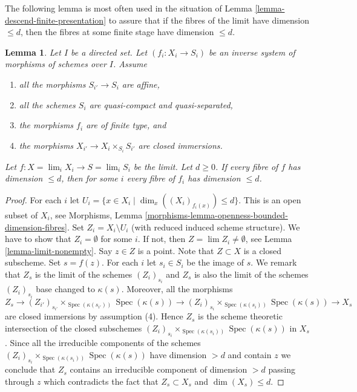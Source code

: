 \documentclass{stacks-project}
\theoremstyle{plain}
\newtheorem{lemma}[subsection]{Lemma}
\theoremstyle{definition}
\theoremstyle{remark}
\numberwithin{equation}{subsection}
\def\lim{\mathop{\mathrm{lim}}\nolimits}
\def\Spec{\mathop{\mathrm{Spec}}}
\begin{document}
\noindent
The following lemma is most often used in the situation of
Lemma \ref{lemma-descend-finite-presentation}
to assure that if the fibres of the limit have dimension $\leq d$,
then the fibres at some finite stage have dimension $\leq d$.

\begin{lemma}
\label{lemma-limit-dimension}
Let $I$ be a directed set.
Let $(f_i : X_i \to S_i)$ be an inverse system of morphisms of schemes
over $I$. Assume
\begin{enumerate}
\item all the morphisms $S_{i'} \to S_i$ are affine,
\item all the schemes $S_i$ are quasi-compact and quasi-separated,
\item the morphisms $f_i$ are of finite type, and
\item the morphisms $X_{i'} \to X_i \times_{S_i} S_{i'}$ are closed
immersions.
\end{enumerate}
Let $f : X = \lim_i X_i \to S = \lim_i S_i$ be the limit.
Let $d \geq 0$.
If every fibre of $f$ has dimension $\leq d$, then for some $i$
every fibre of $f_i$ has dimension $\leq d$.
\end{lemma}

\begin{proof}
For each $i$ let $U_i = \{x \in X_i \mid \dim_x((X_i)_{f_i(x)}) \leq d\}$.
This is an open subset of $X_i$, see
Morphisms, Lemma \ref{morphisms-lemma-openness-bounded-dimension-fibres}.
Set $Z_i = X_i \setminus U_i$ (with reduced induced scheme structure).
We have to show that $Z_i = \emptyset$ for some $i$.
If not, then $Z = \lim Z_i \not = \emptyset$, see
Lemma \ref{lemma-limit-nonempty}.
Say $z \in Z$ is a point. Note that $Z \subset X$ is a closed subscheme.
Set $s = f(z)$. For each $i$ let $s_i \in S_i$ be the image
of $s$. We remark that $Z_s$ is the limit of the schemes $(Z_i)_{s_i}$
and $Z_s$ is also the limit of the schemes $(Z_i)_{s_i}$ base
changed to $\kappa(s)$. Moreover, all the morphisms
$$
Z_s
\longrightarrow
(Z_{i'})_{s_{i'}} \times_{\Spec(\kappa(s_{i'}))} \Spec(\kappa(s))
\longrightarrow
(Z_i)_{s_i} \times_{\Spec(\kappa(s_i))} \Spec(\kappa(s))
\longrightarrow
X_s
$$
are closed immersions by assumption (4). Hence $Z_s$ is the scheme
theoretic intersection of the closed subschemes
$(Z_i)_{s_i} \times_{\Spec(\kappa(s_i))} \Spec(\kappa(s))$
in $X_s$. Since all the irreducible components of the schemes
$(Z_i)_{s_i} \times_{\Spec(\kappa(s_i))} \Spec(\kappa(s))$
have dimension $> d$ and contain $z$ we conclude that
$Z_s$ contains an irreducible component of dimension $> d$ passing
through $z$ which contradicts the fact that $Z_s \subset X_s$ and
$\dim(X_s) \leq d$.
\end{proof}
\end{document}
